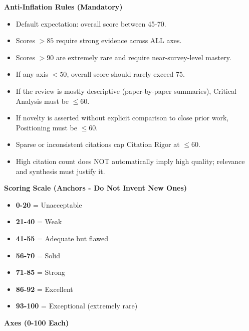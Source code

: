 \vspace{1em}
\noindent\textbf{Anti-Inflation Rules (Mandatory)}
\vspace{0.5em}
\begin{itemize}
    \item Default expectation: overall score between 45-70.
    \item Scores $>85$ require strong evidence across ALL axes.
    \item Scores $>90$ are extremely rare and require near-survey-level mastery.
    \item If any axis $<50$, overall score should rarely exceed 75.
    \item If the review is mostly descriptive (paper-by-paper summaries), Critical Analysis must be $\leq 60$.
    \item If novelty is asserted without explicit comparison to close prior work, Positioning must be $\leq 60$.
    \item Sparse or inconsistent citations cap Citation Rigor at $\leq 60$.
    \item High citation count does NOT automatically imply high quality; relevance and synthesis must justify it.
\end{itemize}

\vspace{1em}
\noindent\textbf{Scoring Scale (Anchors - Do Not Invent New Ones)}
\begin{itemize}
    \item \textbf{0-20} = Unacceptable
    \item \textbf{21-40} = Weak
    \item \textbf{41-55} = Adequate but flawed
    \item \textbf{56-70} = Solid
    \item \textbf{71-85} = Strong
    \item \textbf{86-92} = Excellent
    \item \textbf{93-100} = Exceptional (extremely rare)
\end{itemize}

\vspace{1em}
\noindent\textbf{Axes (0-100 Each)}

